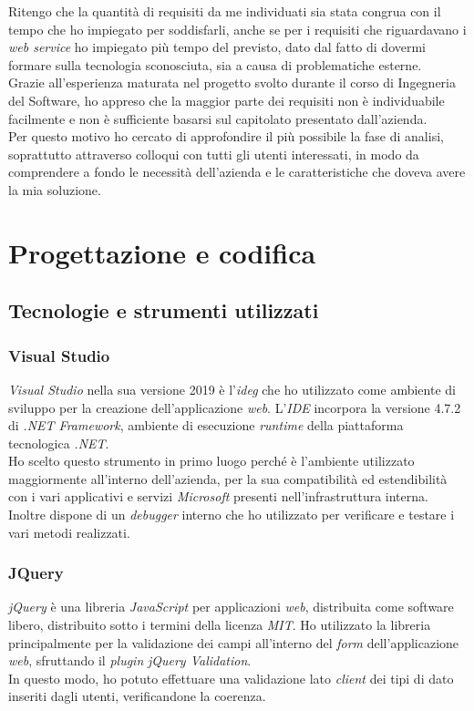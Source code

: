 Ritengo che la quantità di requisiti da me individuati sia stata congrua con il tempo che ho impiegato per soddisfarli, anche se per i requisiti che riguardavano i \textit{web service} ho impiegato più tempo del previsto, dato dal fatto di dovermi formare sulla tecnologia sconosciuta, sia a causa di problematiche esterne.\\
Grazie all'esperienza maturata nel progetto svolto durante il corso di Ingegneria del Software, ho appreso che la maggior parte dei requisiti non è individuabile facilmente e non è sufficiente basarsi sul capitolato presentato dall'azienda.\\
Per questo motivo ho cercato di approfondire il più possibile la fase di analisi, soprattutto attraverso colloqui con tutti gli utenti interessati, in modo da comprendere a fondo le necessità dell'azienda e le caratteristiche che doveva avere la mia soluzione.



\section{Progettazione e codifica}

\subsection{Tecnologie e strumenti utilizzati}

\subsubsection{Visual Studio}
\textit{Visual Studio} nella sua versione 2019 è l'\textit{\gls{ideg}\glsfirstoccur} che ho utilizzato come ambiente di sviluppo per la creazione dell'applicazione \textit{web}. L'\textit{IDE} incorpora la versione 4.7.2 di \textit{.NET Framework}, ambiente di esecuzione \textit{runtime} della piattaforma tecnologica \textit{.NET}.\\
Ho scelto questo strumento in primo luogo perché è l'ambiente utilizzato maggiormente all'interno dell'azienda, per la sua compatibilità ed estendibilità con i vari applicativi e servizi \textit{Microsoft} presenti nell'infrastruttura interna. Inoltre dispone di un \textit{debugger} interno che ho utilizzato per verificare e testare i vari metodi realizzati.

\subsubsection{JQuery}
\textit{jQuery} è una libreria \textit{JavaScript} per applicazioni \textit{web}, distribuita come software libero, distribuito sotto i termini della licenza \textit{MIT}.
Ho utilizzato la libreria principalmente per la validazione dei campi all'interno del \textit{form} dell'applicazione \textit{web}, sfruttando il \textit{plugin} \textit{jQuery Validation}.\\
In questo modo, ho potuto effettuare una validazione lato \textit{client} dei tipi di dato inseriti dagli utenti, verificandone la coerenza.

